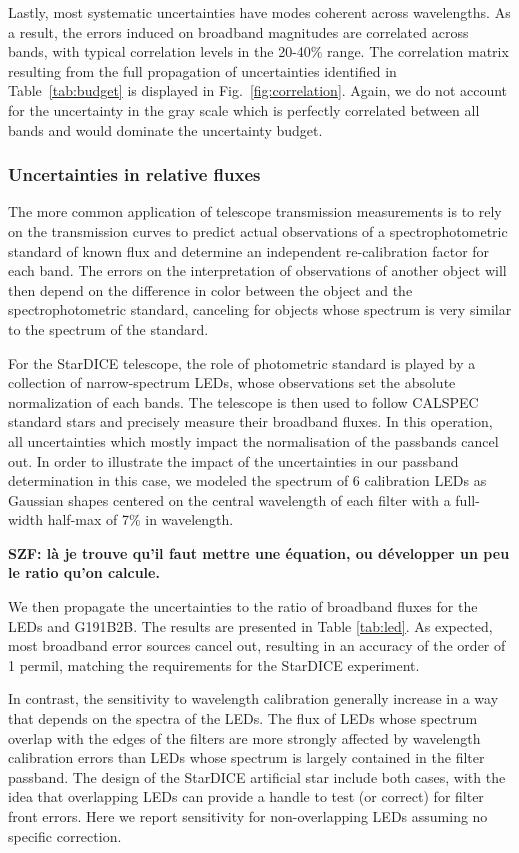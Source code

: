 Lastly, most systematic uncertainties have modes coherent across
wavelengths. As a result, the errors induced on broadband magnitudes
are correlated across bands, with typical correlation levels in the
20-40\% range. The correlation matrix resulting from the full
propagation of uncertainties identified in Table~\ref{tab:budget} is
displayed in Fig.~\ref{fig:correlation}. Again, we do not account for
the uncertainty in the gray scale which is perfectly correlated
between all bands and would dominate the uncertainty budget.

\subsubsection{Uncertainties in relative fluxes}
\label{sec:relative}

The more common application of telescope transmission measurements is
to rely on the transmission curves to predict actual
observations of a spectrophotometric standard of known flux and
determine an independent re-calibration factor for each band. The
errors on the interpretation of observations of another object will
then depend on the difference in color between the object and the
spectrophotometric standard, canceling for objects whose spectrum is
very similar to the spectrum of the standard.

For the StarDICE telescope, the role of photometric standard is played
by a collection of narrow-spectrum LEDs, whose observations set the
absolute normalization of each bands. The telescope is then used to
follow CALSPEC standard stars and precisely measure their broadband
fluxes. In this operation, all uncertainties which mostly impact the
normalisation of the passbands cancel out. In order to illustrate the
impact of the uncertainties in our passband determination in this
case, we modeled the spectrum of 6 calibration LEDs as Gaussian shapes
centered on the central wavelength of each filter with a full-width
half-max of 7\% in wavelength.

\textbf{SZF: là je trouve qu'il faut mettre une équation, ou développer un peu
  le ratio qu'on calcule.}

We then propagate the uncertainties to
the ratio of broadband fluxes for the LEDs and G191B2B. The results
are presented in Table \ref{tab:led}. As expected, most broadband
error sources cancel out, resulting in an accuracy of the order of 1
permil, matching the requirements for the StarDICE experiment.

In contrast, the sensitivity to wavelength calibration generally
increase in a way that depends on the spectra of the LEDs. The flux of
LEDs whose spectrum overlap with the edges of the filters are more
strongly affected by wavelength calibration errors than LEDs whose
spectrum is largely contained in the filter passband. The design of
the StarDICE artificial star include both cases, with the idea that
overlapping LEDs can provide a handle to test (or correct) for filter
front errors. Here we report sensitivity for non-overlapping LEDs
assuming no specific correction.

